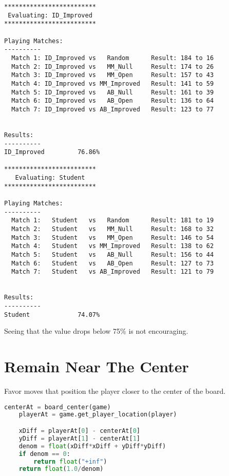 \documentclass[10pt, a4paper]{article}
\begin{document}
\begin{verbatim}
*************************
 Evaluating: ID_Improved 
*************************

Playing Matches:
----------
  Match 1: ID_Improved vs   Random    	Result: 184 to 16
  Match 2: ID_Improved vs   MM_Null   	Result: 174 to 26
  Match 3: ID_Improved vs   MM_Open   	Result: 157 to 43
  Match 4: ID_Improved vs MM_Improved 	Result: 141 to 59
  Match 5: ID_Improved vs   AB_Null   	Result: 161 to 39
  Match 6: ID_Improved vs   AB_Open   	Result: 136 to 64
  Match 7: ID_Improved vs AB_Improved 	Result: 123 to 77


Results:
----------
ID_Improved         76.86%

*************************
   Evaluating: Student   
*************************

Playing Matches:
----------
  Match 1:   Student   vs   Random    	Result: 181 to 19
  Match 2:   Student   vs   MM_Null   	Result: 168 to 32
  Match 3:   Student   vs   MM_Open   	Result: 146 to 54
  Match 4:   Student   vs MM_Improved 	Result: 138 to 62
  Match 5:   Student   vs   AB_Null   	Result: 156 to 44
  Match 6:   Student   vs   AB_Open   	Result: 127 to 73
  Match 7:   Student   vs AB_Improved 	Result: 121 to 79


Results:
----------
Student             74.07%
\end{verbatim}

Seeing that the value drops below 75\% is not encouraging.

\section{Remain Near The Center}

Favor moves that position the player closer to the center of the board.

\begin{lstlisting}[language=Python]
    centerAt = board_center(game)
    playerAt = game.get_player_location(player)

    xDiff = playerAt[0] - centerAt[0]
    yDiff = playerAt[1] - centerAt[1]
    denom = float(xDiff*xDiff + yDiff*yDiff)
    if denom == 0:
        return float("+inf")
    return float(1.0/denom)
\end{lstlisting}
\end{document}

